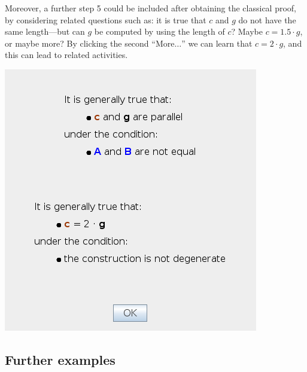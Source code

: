 \documentclass{article}
\begin{document}
Moreover, a further step 5 could be included after obtaining the classical proof, by considering related questions such as: it is true that $c$ and $g$ do not have the same length---but can $g$ be computed by using the length of $c$? Maybe $c=1.5\cdot g$, or maybe more? By clicking the second ``More$\ldots$'' we can learn that $c=2\cdot g$, and this can lead to related activities.

\begin{center}
\includegraphics[scale=0.5]{classroom3-Relation-2}
\end{center}


\subsection{Further examples}\label{sec:further}
\end{document}
